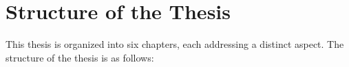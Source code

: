 \begin{comment}
    \item \textbf{Scalable Architecture for Future Extensions:} The architecture of the SMKIT is designed to be scalable and adaptable, allowing it to accommodate future changes in platform APIs, metadata standards, and content types. This ensures the framework's long-term viability and utility in rapidly evolving technological environments.

    \item \textbf{Contribution to the Open-Source Community:} The SMKIT framework and its modules are released as open-source software, providing a valuable resource for researchers and practitioners interested in web content automation, metadata extraction, and social media integration. This contribution promotes collaboration and further innovation in the field.
\end{itemize}
\end{comment}


\section{Structure of the Thesis}
\label{sec:structure_of_the_thesis}
This thesis is organized into six chapters, each addressing a distinct aspect. The structure of the thesis is as follows:

